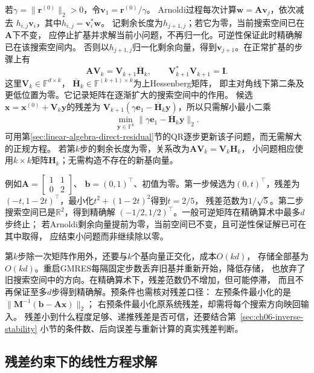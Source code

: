 若$\gamma=\lVert\bm r^{(0)}\rVert_2>0$，令$\bm v_1=\bm r^{(0)}/\gamma$。
Arnoldi过程每次计算$\bm w=\bm A\bm v_j$，依次减去
$h_{i,j}\bm v_i$，其中$h_{i,j}=\bm v_i^*\bm w$。
记剩余长度为$h_{j+1,j}$；若它为零，当前搜索空间已在$\bm A$下不变，
应停止扩基并求解当前小问题，不再归一化。可逆性保证此时精确解已在该搜索空间内。
否则以$h_{j+1,j}$归一化剩余向量，得到$\bm v_{j+1}$。在正常扩基的步骤上有
\[
 \bm A\bm V_k=\bm V_{k+1}\overline{\bm H}_k,
 \qquad
 \bm V_{k+1}^*\bm V_{k+1}=\bm I.
\]
这里$\bm V_k\in\mathbb F^{d\times k}$，
$\overline{\bm H}_k\in\mathbb F^{(k+1)\times k}$为上Hessenberg矩阵，
即主对角线下第二条及更低位置为零。它记录矩阵在逐渐扩大的搜索空间中的作用。
候选$\bm x=\bm x^{(0)}+\bm V_k\bm y$的残差为
$\bm V_{k+1}(\gamma\bm e_1-\overline{\bm H}_k\bm y)$，所以只需解小最小二乘
\[
 \min_{\bm y\in\mathbb F^k}
 \lVert\gamma\bm e_1-\overline{\bm H}_k\bm y\rVert_2.
\]
可用第\ref{sec:linear-algebra-direct-residual}节的QR逐步更新该子问题，而无需解大的正规方程。
若第$k$步的剩余长度为零，关系改为$\bm A\bm V_k=\bm V_k\bm H_k$，
小问题相应使用$k\times k$矩阵$\bm H_k$；无需构造不存在的新基向量。

例如$\bm A=\left[\begin{smallmatrix}1&1\\0&2\end{smallmatrix}\right]$、
$\bm b=(0,1)^\top$、初值为零。第一步候选为$(0,t)^\top$，残差为
$(-t,1-2t)^\top$，最小化$t^2+(1-2t)^2$得到$t=2/5$，
残差范数为$1/\sqrt5$。第二步搜索空间已是$\mathbb R^2$，得到精确解
$(-1/2,1/2)^\top$。一般可逆矩阵在精确算术中最多$d$步终止；
若Arnoldi剩余向量提前为零，当前空间已不变，且可逆性保证解已可在其中取得，
应结束小问题而非继续除以零。

第$k$步除一次矩阵作用外，还要与$k$个基向量正交化，成本$O(kd)$，
存储全部基为$O(kd)$。重启GMRES每隔固定步数丢弃旧基并重新开始，降低存储，
也放弃了旧搜索空间中的方向。在精确算术下，残差范数仍不增加，但可能停滞，
而且不再保证至多$d$步得到精确解。预条件也需核对残差口径：
左预条件最小化的是$\lVert\bm M^{-1}(\bm b-\bm A\bm x)\rVert_2$；
右预条件最小化原系统残差，却需将每个搜索方向映回输入。
残差小到什么程度足够、递推残差是否可信，还要结合第~\ref{sec:ch06-inverse-stability}
小节的条件数、后向误差与重新计算的真实残差判断。

\subsection{残差约束下的线性方程求解}
\label{sec:linear-algebra-residual-systems}
\label{sec:linear-algebra-projection-least-squares}

